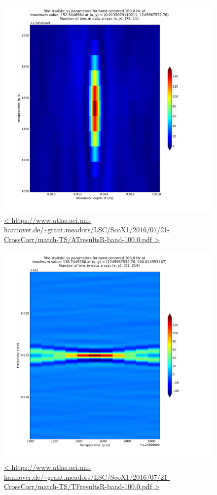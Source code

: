 \documentclass{article}
\begin{document}
\begin{figure}
\includegraphics[trim= 0 0 0 0, clip, width=0.40\paperwidth,keepaspectratio]{plots/match-TS/ATresultsR-band-100-0.pdf}
\caption{
\url{<
https://www.atlas.aei.uni-hannover.de/~grant.meadors/LSC/ScoX1/2016/07/21-CrossCorr/match-TS/ATresultsR-band-100.0.pdf
>}
}
\label{ATcenterGraph}
\end{figure}

\begin{figure}
\includegraphics[trim= 0 0 0 0, clip, width=0.40\paperwidth,keepaspectratio]{plots/match-TS/TFresultsR-band-100-0.pdf}
\caption{
\url{<
https://www.atlas.aei.uni-hannover.de/~grant.meadors/LSC/ScoX1/2016/07/21-CrossCorr/match-TS/TFresultsR-band-100.0.pdf
>}
}
\label{TFcenterGraph}
\end{figure}
\end{document}
